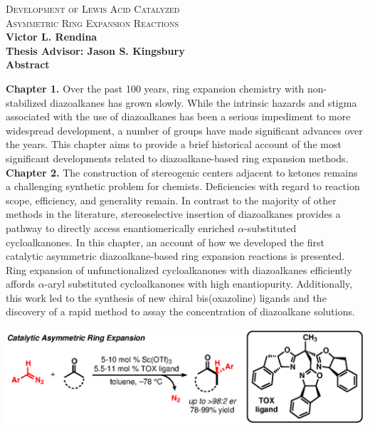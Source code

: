 \thispagestyle{empty}

\begin{center}
\textsc{{\Large Development of Lewis Acid Catalyzed \\  Asymmetric Ring Expansion Reactions}}\\
\vspace{5mm}
\textbf{Victor L. Rendina} \\
\vspace{5mm}
\textbf{Thesis Advisor: Jason S. Kingsbury} \\ 
\vspace{5mm} 
\textbf{Abstract}
\end{center}

\doublespacing
\noindent {} \textbf{Chapter 1.} Over the past 100 years, ring expansion chemistry with
non-stabilized diazoalkanes has grown slowly. While the intrinsic hazards and
stigma associated with the use of diazoalkanes has been a serious impediment to more widespread
development, a number of groups have made significant advances over the years. This chapter aims to provide a brief historical account of the
most significant developments related to diazoalkane-based ring expansion methods. 
\\
 \textbf{Chapter 2.} The construction of stereogenic centers adjacent to ketones remains a
challenging synthetic problem for chemists. Deficiencies with regard to reaction scope, efficiency,
and generality remain. In contrast to the majority of other methods in the literature,
stereoselective insertion of diazoalkanes provides a pathway to directly access enantiomerically
enriched $\alpha$-substituted cycloalkanones.
In this chapter, an account of how we developed the first catalytic asymmetric diazoalkane-based
ring expansion reactions is presented. Ring expansion of unfunctionalized cycloalkanones with
diazoalkanes efficiently affords $\alpha$-aryl substituted cycloalkanones with high
enantiopurity.
Additionally, this work led to the synthesis of new chiral bis(oxazoline) ligands and the discovery
of a rapid method to assay the concentration of diazoalkane solutions.

\begin{center}
\includegraphics[scale=0.8]{chp_asymmetric_abstract}
\end{center}

